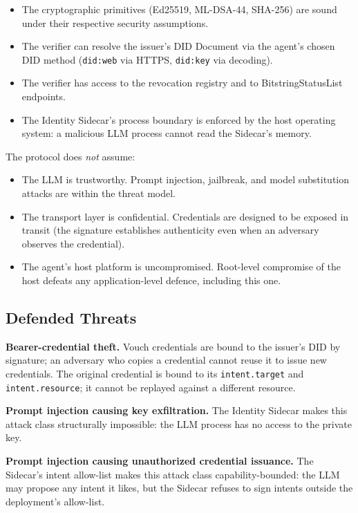 \documentclass[11pt,a4paper,twocolumn]{article}
\begin{document}
\begin{itemize}[leftmargin=*]
\item The cryptographic primitives (Ed25519, ML-DSA-44, SHA-256) are sound under their respective security assumptions.
\item The verifier can resolve the issuer's DID Document via the agent's chosen DID method (\texttt{did:web} via HTTPS, \texttt{did:key} via decoding).
\item The verifier has access to the revocation registry and to BitstringStatusList endpoints.
\item The Identity Sidecar's process boundary is enforced by the host operating system: a malicious LLM process cannot read the Sidecar's memory.
\end{itemize}

The protocol does \emph{not} assume:

\begin{itemize}[leftmargin=*]
\item The LLM is trustworthy. Prompt injection, jailbreak, and model substitution attacks are within the threat model.
\item The transport layer is confidential. Credentials are designed to be exposed in transit (the signature establishes authenticity even when an adversary observes the credential).
\item The agent's host platform is uncompromised. Root-level compromise of the host defeats any application-level defence, including this one.
\end{itemize}

\subsection{Defended Threats}

\noindent\textbf{Bearer-credential theft.} Vouch credentials are bound to the issuer's DID by signature; an adversary who copies a credential cannot reuse it to issue new credentials. The original credential is bound to its \verb|intent.target| and \verb|intent.resource|; it cannot be replayed against a different resource.

\noindent\textbf{Prompt injection causing key exfiltration.} The Identity Sidecar makes this attack class structurally impossible: the LLM process has no access to the private key.

\noindent\textbf{Prompt injection causing unauthorized credential issuance.} The Sidecar's intent allow-list makes this attack class capability-bounded: the LLM may propose any intent it likes, but the Sidecar refuses to sign intents outside the deployment's allow-list.
\end{document}
